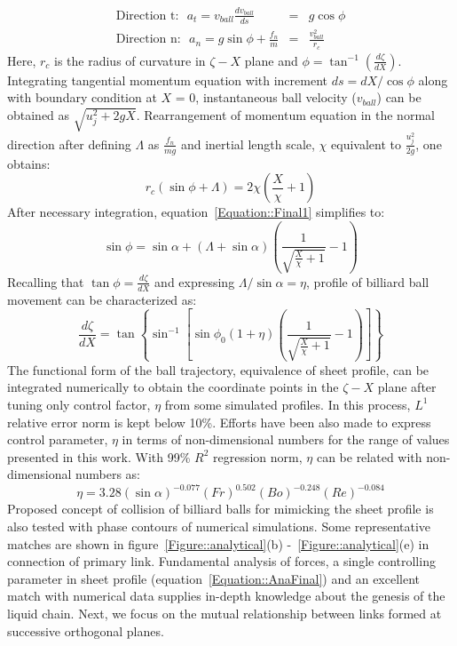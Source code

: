 \documentclass{jfm}
\begin{document}
\begin{subequations}%
	\label{Equation::forceBal}	
	\begin{eqnarray}
	\label{Equation::tangential(a)}
	\text{Direction t:}\:\:\: a_t = v_{ball}\frac{dv_{ball}}{ds} &=& g\cos\phi\\
	\text{Direction n:}\:\:\: a_n = g\sin\phi + \frac{f_n}{m} &=& \frac{v_{ball}^2}{r_c}
	\end{eqnarray}
\end{subequations}
Here, $r_c$ is the radius of curvature in $\zeta-X$ plane and $\phi = \tan^{-1}\left(\frac{d\zeta}{dX}\right)$. Integrating tangential momentum equation with increment $ds = dX/\cos\phi$ along with boundary condition at $X$ = 0, instantaneous ball velocity ($v_{ball}$) can be obtained as $\sqrt{u_j^2 + 2gX}$. Rearrangement of momentum equation in the normal direction after defining $\Lambda$ as $\frac{f_n}{mg}$ and inertial length scale, $\chi$ equivalent to $\frac{u_j^2}{2g}$, one obtains:
\begin{equation}\label{Equation::Final1}
r_c\left(\sin\phi + \Lambda\right) = 2\chi\left(\frac{X}{\chi} + 1\right)
\end{equation} 
After necessary integration, equation~\ref{Equation::Final1} simplifies to:
\begin{equation}
\sin\phi  = \sin\alpha + \left(\Lambda + \sin\alpha\right)\left(\frac{1}{\sqrt{\frac{X}{\chi} + 1}} - 1\right)	
\end{equation}
Recalling that $\tan\phi = \frac{d\zeta}{dX}$ and expressing $\Lambda/\sin\alpha = \eta$, profile of billiard ball movement can be characterized as:
\begin{equation}
\label{Equation::AnaFinal}
\frac{d\zeta}{dX} = \tan\left\lbrace\sin^{-1}\left[ \sin\phi_0\left(1 + \eta\right)\left(\frac{1}{\sqrt{\frac{X}{\chi} + 1}} - 1\right) \right]\right\rbrace
\end{equation}
The functional form of the ball trajectory, equivalence of sheet profile, can be integrated numerically to obtain the coordinate points in the $\zeta-X$ plane after tuning only control factor, $\eta$ from some simulated profiles. In this process, $L^1$ relative error norm is kept below 10\%. Efforts have been also made to express control parameter, $\eta$ in terms of non-dimensional numbers for the range of values presented in this work. With 99\% $R^2$ regression norm, $\eta$ can be related with non-dimensional numbers as:
\begin{equation}\label{Equation::eta}
\eta = 3.28(\sin\alpha)^{-0.077}(Fr)^{0.502}(Bo)^{-0.248}\left(Re\right)^{-0.084}
\end{equation}
Proposed concept of collision of billiard balls for mimicking the sheet profile is also tested with phase contours of numerical simulations. Some representative matches are shown in figure~\ref{Figure::analytical}(b) -~\ref{Figure::analytical}(e) in connection of primary link. Fundamental analysis of forces, a single controlling parameter in sheet profile (equation~\ref{Equation::AnaFinal}) and an excellent match with numerical data supplies in-depth knowledge about the genesis of the liquid chain. Next, we focus on the mutual relationship between links formed at successive orthogonal planes. 
\end{document}
